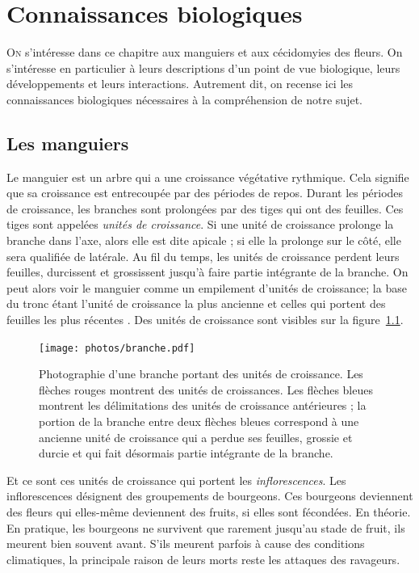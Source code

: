 \chapter{Connaissances biologiques} 

\lettrine{O}{n} s'intéresse dans ce chapitre aux manguiers et aux cécidomyies des fleurs.
On s'intéresse en particulier à leurs descriptions d'un point de vue biologique, leurs développements et leurs interactions.
Autrement dit, on recense ici les connaissances biologiques nécessaires à la compréhension de notre sujet.


\section{Les manguiers}

Le manguier est un arbre qui a une croissance végétative rythmique.
Cela signifie que sa croissance est entrecoupée par des périodes de repos.
Durant les périodes de croissance, les branches sont prolongées par des tiges qui ont des feuilles.
Ces tiges sont appelées \emph{unités de croissance}. 
Si une unité de croissance prolonge la branche dans l'axe, alors elle est dite apicale ; si elle la prolonge sur le côté, elle sera qualifiée de latérale.
Au fil du temps, les unités de croissance perdent leurs feuilles, durcissent et grossissent jusqu'à faire partie intégrante de la branche.
On peut alors voir le manguier comme un empilement d'unités de croissance;
la base du tronc étant l'unité de croissance la plus ancienne et celles qui portent des feuilles les plus récentes \citep{normand2009}.
Des unités de croissance sont visibles sur la figure~\ref{fig:uc}.
\begin{figure}[ht]
 \centering
 \texttt{[image: photos/branche.pdf]}
 \caption{Photographie d'une branche portant des unités de croissance. Les flèches rouges montrent des unités de croissances. Les flèches bleues montrent les délimitations des unités de croissance antérieures ; la portion de la branche entre deux flèches bleues correspond à une ancienne unité de croissance qui a perdue ses feuilles, grossie et durcie et qui fait désormais partie intégrante de la branche.}
 \label{fig:uc}
\end{figure}

Et ce sont ces unités de croissance qui portent les \emph{inflorescences}.
Les inflorescences désignent des groupements de bourgeons. 
Ces bourgeons deviennent des fleurs qui elles-même deviennent des fruits, si elles sont fécondées.
En théorie.
En pratique, les bourgeons ne survivent que rarement jusqu'au stade de fruit, ils meurent bien souvent avant.
S'ils meurent parfois à cause des conditions climatiques, la principale raison de leurs morts reste les attaques des ravageurs.

